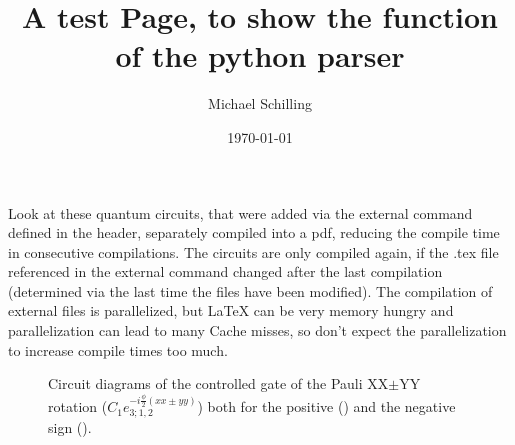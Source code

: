 


\title{A test Page, to show the function of the python parser}

\author{Michael Schilling}

\date{\today}

\begin{abstract}
\lipsum
\end{abstract}

\maketitle

Look at these quantum circuits, that were added via the external command defined in the header, separately compiled into a pdf, reducing the compile time in consecutive compilations. The circuits are only compiled again, if the .tex file referenced in the external command changed after the last compilation (determined via the last time the files have been modified).  The compilation of external files is parallelized, but LaTeX can be very memory hungry and parallelization can lead to many Cache misses, so don't expect the parallelization to increase compile times too much. 
\begin{figure}[htb] 
\centering
\begin{minipage}{0.48\textwidth}
  \centering
  \subcaption{\label{fig:cxx_yy}}
\end{minipage}
\begin{minipage}{0.48\textwidth}
  \centering
  \subcaption{\label{fig:cxx_yy2}}
\end{minipage}
\caption{Circuit diagrams of the controlled gate of the Pauli XX$\pm$YY rotation ($C_1e^{-i\frac{\phi}{2}(xx \pm yy)}_{3;1,2}$) both for the positive () and the negative sign ().}
\end{figure}
